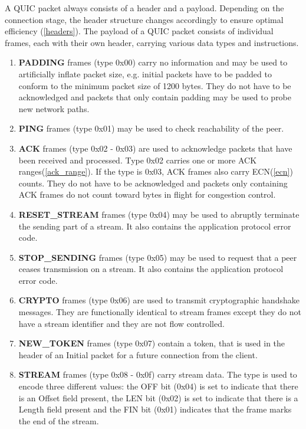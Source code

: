 A QUIC packet always consists of a header and a payload. Depending on the connection stage, the header structure changes accordingly to ensure optimal efficiency (\ref{headers}). The payload of a QUIC packet consists of individual frames, each with their own header, carrying various data types and instructions.
\begin{enumerate}
    \item \textbf{PADDING} frames (type 0x00) carry no information and may be used to artificially inflate packet size, e.g. initial packets have to be padded to conform to the minimum packet size of 1200 bytes. They do not have to be acknowledged and packets that only contain padding may be used to probe new network paths. \cite[104]{rfc9000}
    \item \textbf{PING} frames (type 0x01) may be used to check reachability of the peer. \cite[105]{rfc9000}
    \item \textbf{ACK} frames (type 0x02 - 0x03) are used to acknowledge packets that have been received and processed. Type 0x02 carries one or more ACK ranges(\ref{ack_range}). If the type is 0x03, ACK frames also carry ECN(\ref{ecn}) counts. They do not have to be acknowledged and packets only containing ACK frames do not count toward bytes in flight for congestion control. \cite[105]{rfc9000}
    \item \textbf{RESET\_STREAM} frames (type 0x04) may be used to abruptly terminate the sending part of a stream. It also contains the application protocol error code. \cite[108]{rfc9000}
    \item \textbf{STOP\_SENDING} frames (type 0x05) may be used to request that a peer ceases transmission on a stream. It also contains the application protocol error code. \cite[109]{rfc9000}
    \item \textbf{CRYPTO} frames (type 0x06) are used to transmit cryptographic handshake messages. They are functionally identical to stream frames except they do not have a stream identifier and they are not flow controlled. \cite[110]{rfc9000}
    \item \textbf{NEW\_TOKEN} frames (type 0x07) contain a token, that is used in the header of an Initial packet for a future connection from the client. \cite[110]{rfc9000}
    \item \textbf{STREAM} frames (type 0x08 - 0x0f) carry stream data. The type is used to encode three different values: the OFF bit (0x04) is set to indicate that there is an Offset field present, the LEN bit (0x02) is set to indicate that there is a Length field present and the FIN bit (0x01) indicates that the frame marks the end of the stream.\cite[111]{rfc9000}

\end{enumerate}
